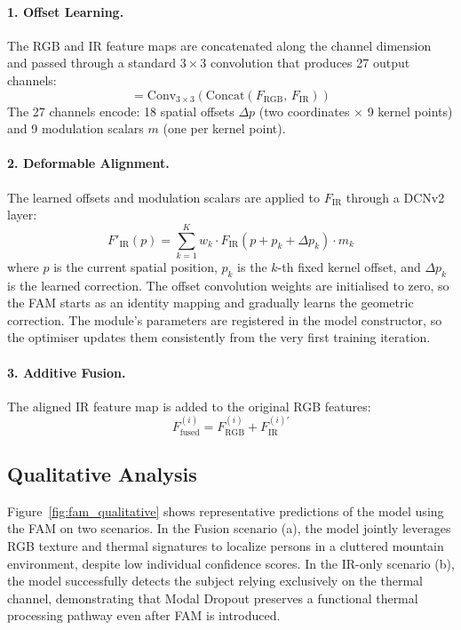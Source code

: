 \documentclass[12pt, a4paper]{article}
\begin{document}
\paragraph{1. Offset Learning.} The RGB and IR feature maps are concatenated along the channel dimension and passed through a standard $3\times3$ convolution that produces 27 output channels:
\begin{equation}
    [\Delta p,\, m] = \text{Conv}_{3\times3}\!\left(\text{Concat}(F_{\text{RGB}},\, F_{\text{IR}})\right)
\end{equation}
The 27 channels encode: 18 spatial offsets $\Delta p$ (two coordinates $\times$ 9 kernel points) and 9 modulation scalars $m$ (one per kernel point).

\paragraph{2. Deformable Alignment.} The learned offsets and modulation scalars are applied to $F_{\text{IR}}$ through a DCNv2 layer:
\begin{equation}
    F'_{\text{IR}}(p) = \sum_{k=1}^{K} w_k \cdot F_{\text{IR}}\!\left(p + p_k + \Delta p_k\right) \cdot m_k
\end{equation}
where $p$ is the current spatial position, $p_k$ is the $k$-th fixed kernel offset, and $\Delta p_k$ is the learned correction. The offset convolution weights are initialised to zero, so the FAM starts as an identity mapping and gradually learns the geometric correction. The module's parameters are registered in the model constructor, so the optimiser updates them consistently from the very first training iteration.

\paragraph{3. Additive Fusion.} The aligned IR feature map is added to the original RGB features:
\begin{equation}
    F^{(i)}_{\text{fused}} = F^{(i)}_{\text{RGB}} + F^{(i)\prime}_{\text{IR}}
\end{equation}

\subsection{Qualitative Analysis}

Figure~\ref{fig:fam_qualitative} shows representative predictions of the model using the FAM on two scenarios. In the Fusion scenario (a), the model jointly leverages RGB texture and thermal signatures to localize persons in a cluttered mountain environment, despite low individual confidence scores. In the IR-only scenario (b), the model successfully detects the subject relying exclusively on the thermal channel, demonstrating that Modal Dropout preserves a functional thermal processing pathway even after FAM is introduced.
\end{document}
